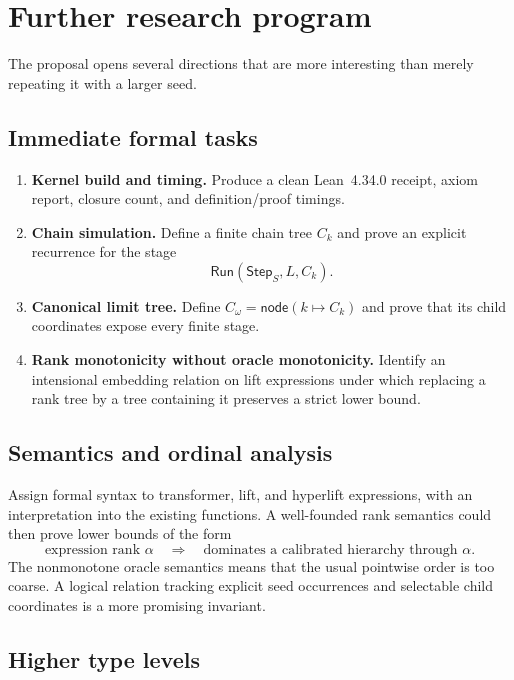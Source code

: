 \documentclass[11pt]{article}
\theoremstyle{definition}
\theoremstyle{remark}
\newcommand{\Step}{\mathsf{Step}}
\newcommand{\Run}{\mathsf{Run}}
\begin{document}
\section{Further research program}

The proposal opens several directions that are more interesting than merely
repeating it with a larger seed.

\subsection{Immediate formal tasks}

\begin{enumerate}[leftmargin=*]
\item \textbf{Kernel build and timing.}  Produce a clean Lean~4.34.0 receipt,
  axiom report, closure count, and definition/proof timings.
\item \textbf{Chain simulation.}  Define a finite chain tree \(C_k\)
  and prove an explicit recurrence for the stage
  \[
  \Run(\Step_S,L,C_k).
  \]
\item \textbf{Canonical limit tree.}  Define
  \(C_\omega=\mathsf{node}(k\mapsto C_k)\) and prove that its child coordinates
  expose every finite stage.
\item \textbf{Rank monotonicity without oracle monotonicity.}  Identify an
  intensional embedding relation on lift expressions under which replacing a
  rank tree by a tree containing it preserves a strict lower bound.
\end{enumerate}

\subsection{Semantics and ordinal analysis}

Assign formal syntax to transformer, lift, and hyperlift expressions, with an
interpretation into the existing functions.  A well-founded rank semantics
could then prove lower bounds of the form
\[
\text{expression rank }\alpha\quad\Longrightarrow\quad
\text{dominates a calibrated hierarchy through }\alpha.
\]
The nonmonotone oracle semantics means that the usual pointwise order is too
coarse.  A logical relation tracking explicit seed occurrences and selectable
child coordinates is a more promising invariant.

\subsection{Higher type levels}
\end{document}

